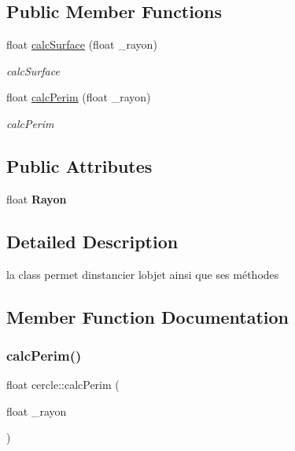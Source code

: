 \subsection*{Public Member Functions}
\begin{DoxyCompactItemize}
\item 
float \hyperlink{classcercle_a6d52510464c33891cac6bf7580d559da}{calc\+Surface} (float \+\_\+rayon)
\begin{DoxyCompactList}\small\item\em calc\+Surface \end{DoxyCompactList}\item 
float \hyperlink{classcercle_a5f309ec11993e49a8f9009ddb797dcd0}{calc\+Perim} (float \+\_\+rayon)
\begin{DoxyCompactList}\small\item\em calc\+Perim \end{DoxyCompactList}\end{DoxyCompactItemize}
\subsection*{Public Attributes}
\begin{DoxyCompactItemize}
\item 
\mbox{\label{classcercle_aed10f4294672b96cd33ae2826a316273}} 
float {\bfseries Rayon}
\end{DoxyCompactItemize}


\subsection{Detailed Description}
la class permet d\textquotesingle{}instancier l\textquotesingle{}objet ainsi que ses méthodes 

\subsection{Member Function Documentation}
\mbox{\label{classcercle_a5f309ec11993e49a8f9009ddb797dcd0}} 
\subsubsection{\texorpdfstring{calc\+Perim()}{calcPerim()}}
{\footnotesize\ttfamily float cercle\+::calc\+Perim (\begin{DoxyParamCaption}\item[{float}]{\+\_\+rayon }\end{DoxyParamCaption})}



